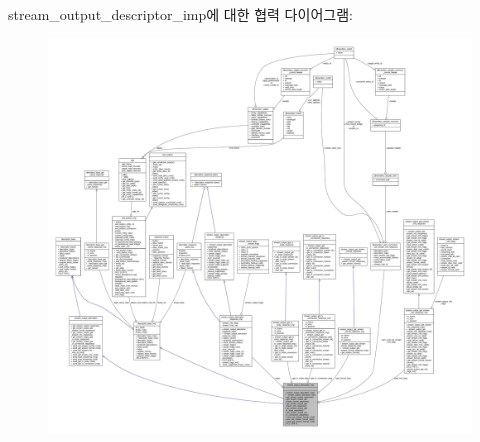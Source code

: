 stream\+\_\+output\+\_\+descriptor\+\_\+imp에 대한 협력 다이어그램\+:
\nopagebreak
\begin{figure}[H]
\begin{center}
\leavevmode
\includegraphics[width=350pt]{classavdecc__lib_1_1stream__output__descriptor__imp__coll__graph}
\end{center}
\end{figure}

